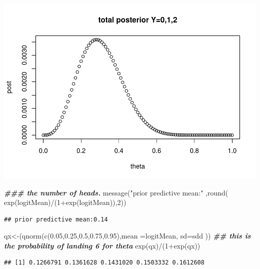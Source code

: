 \documentclass[
]{book}
\newenvironment{Shaded}{\begin{snugshade}}{\end{snugshade}}
\newcommand{\AttributeTok}[1]{\textcolor[rgb]{0.77,0.63,0.00}{#1}}
\newcommand{\DecValTok}[1]{\textcolor[rgb]{0.00,0.00,0.81}{#1}}
\newcommand{\DocumentationTok}[1]{\textcolor[rgb]{0.56,0.35,0.01}{\textbf{\textit{#1}}}}
\newcommand{\FloatTok}[1]{\textcolor[rgb]{0.00,0.00,0.81}{#1}}
\newcommand{\FunctionTok}[1]{\textcolor[rgb]{0.00,0.00,0.00}{#1}}
\newcommand{\NormalTok}[1]{#1}
\newcommand{\OtherTok}[1]{\textcolor[rgb]{0.56,0.35,0.01}{#1}}
\newcommand{\SpecialCharTok}[1]{\textcolor[rgb]{0.00,0.00,0.00}{#1}}
\newcommand{\StringTok}[1]{\textcolor[rgb]{0.31,0.60,0.02}{#1}}
\theoremstyle{definition}
\theoremstyle{definition}
\theoremstyle{definition}
\theoremstyle{definition}
\theoremstyle{remark}
\begin{document}
\includegraphics{_main_files/figure-latex/unnamed-chunk-11-2.pdf}

\begin{Shaded}
\begin{Highlighting}[]
    \DocumentationTok{\#\#\# the number of heads.    }
  \FunctionTok{message}\NormalTok{(}\StringTok{"prior predictive mean:"}\NormalTok{ ,}\FunctionTok{round}\NormalTok{( }\FunctionTok{exp}\NormalTok{(logitMean)}\SpecialCharTok{/}\NormalTok{(}\DecValTok{1}\SpecialCharTok{+}\FunctionTok{exp}\NormalTok{(logitMean)),}\DecValTok{2}\NormalTok{))}
\end{Highlighting}
\end{Shaded}

\begin{verbatim}
## prior predictive mean:0.14
\end{verbatim}

\begin{Shaded}
\begin{Highlighting}[]
\NormalTok{ qx}\OtherTok{\textless{}{-}}\NormalTok{(}\FunctionTok{qnorm}\NormalTok{(}\FunctionTok{c}\NormalTok{(}\FloatTok{0.05}\NormalTok{,}\FloatTok{0.25}\NormalTok{,}\FloatTok{0.5}\NormalTok{,}\FloatTok{0.75}\NormalTok{,}\FloatTok{0.95}\NormalTok{),}\AttributeTok{mean =}\NormalTok{logitMean, }\AttributeTok{sd=}\NormalTok{sdd ))}
 \DocumentationTok{\#\# this is the probability of landing 6 for theta}
 \FunctionTok{exp}\NormalTok{(qx)}\SpecialCharTok{/}\NormalTok{(}\DecValTok{1}\SpecialCharTok{+}\FunctionTok{exp}\NormalTok{(qx))}
\end{Highlighting}
\end{Shaded}

\begin{verbatim}
## [1] 0.1266791 0.1361628 0.1431020 0.1503332 0.1612608
\end{verbatim}
\end{document}
